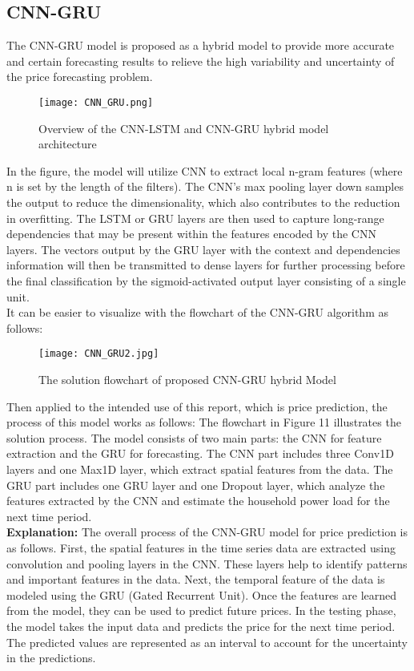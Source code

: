 \documentclass{ieeeojies}
\begin{document}
\subsection{CNN-GRU}
The CNN-GRU model is proposed as a hybrid model to provide more accurate and certain forecasting results to relieve the high variability and uncertainty of the price forecasting problem.\\
\begin{figure} [H]
    \centering
    \texttt{[image: CNN\_GRU.png]}
    \caption{Overview of the CNN-LSTM and CNN-GRU hybrid model architecture}
    \label{fig:enter-label}
\end{figure}
In the figure, the model will utilize CNN to extract local n-gram features (where n is set by the length of the filters). The CNN’s max pooling layer down samples the output to reduce the dimensionality, which also contributes to the reduction in overfitting. The LSTM or GRU layers are then used to capture long-range dependencies that may be present within the features encoded by the CNN layers. The vectors output by the GRU layer with the context and dependencies information will then be transmitted to dense layers for further processing before the final classification by the sigmoid-activated output layer consisting of a single unit.  \cite{nguyen1}\\
It can be easier to visualize with the flowchart of the CNN-GRU algorithm as follows:
\begin{figure} [H]
    \centering
    \texttt{[image: CNN\_GRU2.jpg]}
    \caption{The solution flowchart of proposed CNN-GRU hybrid Model\cite{nguyen2}}
    \label{fig:enter-label}
\end{figure}
Then applied to the intended use of this report, which is price prediction, the process of this model works as follows:
The flowchart in Figure 11 illustrates the solution process. The model consists of two main parts: the CNN for feature extraction and the GRU for forecasting. The CNN part includes three Conv1D layers and one Max1D layer, which extract spatial features from the data. The GRU part includes one GRU layer and one Dropout layer, which analyze the features extracted by the CNN and estimate the household power load for the next time period.\\
\textbf{Explanation:}
The overall process of the CNN-GRU model for price prediction is as follows. First, the spatial features in the time series data are extracted using convolution and pooling layers in the CNN. These layers help to identify patterns and important features in the data. Next, the temporal feature of the data is modeled using the GRU (Gated Recurrent Unit).
Once the features are learned from the model, they can be used to predict future prices. In the testing phase, the model takes the input data and predicts the price for the next time period. The predicted values are represented as an interval to account for the uncertainty in the predictions.\\
\end{document}
